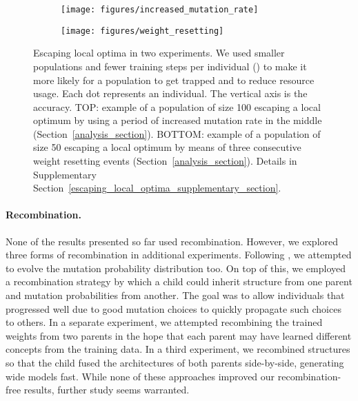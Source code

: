 \documentclass{article}
\begin{document}
\begin{figure}
    \vskip 0.2in
    \begin{centering}
        \begin{subfigure}[b]{1.0\columnwidth}
            \begin{centering}
                \centerline{\texttt{[image: figures/increased\_mutation\_rate]}}
            \end{centering}
        \end{subfigure}
        \begin{subfigure}[b]{1.0\columnwidth}
            \begin{centering}
                \centerline{\texttt{[image: figures/weight\_resetting]}}
            \end{centering}
        \end{subfigure}
        \caption{Escaping local optima in two experiments. We used smaller populations and fewer training steps per individual () to make it more likely for a population to get trapped and to reduce resource usage. Each dot represents an individual. The vertical axis is the accuracy. TOP: example of a population of size 100 escaping a local optimum by using a period of increased mutation rate in the middle (Section~\ref{analysis_section}). BOTTOM: example of a population of size 50 escaping a local optimum by means of three consecutive weight resetting events (Section~\ref{analysis_section}). Details in Supplementary Section~\ref{escaping_local_optima_supplementary_section}.}
        \label{escape_figure}
    \end{centering}
    \vskip 0.2in
\end{figure}

\vspace{-1em}
\paragraph{Recombination.} None of the results presented so far used recombination. However, we explored three forms of recombination in additional experiments. Following \citet{tuson1998adapting}, we attempted to evolve the mutation probability distribution too. On top of this, we employed a recombination strategy by which a child could inherit structure from one parent and mutation probabilities from another. The goal was to allow individuals that progressed well due to good mutation choices to quickly propagate such choices to others. In a separate experiment, we attempted recombining the trained weights from two parents in the hope that each parent may have learned different concepts from the training data. In a third experiment, we recombined structures so that the child fused the architectures of both parents side-by-side, generating wide models fast. While none of these approaches improved our recombination-free results, further study seems warranted.
\end{document}
